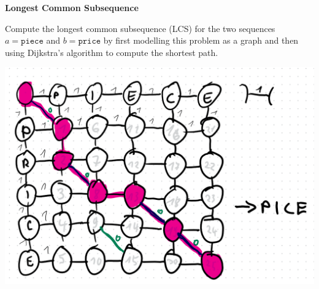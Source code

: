\question \textbf{Longest Common Subsequence}

Compute the longest common subsequence (LCS) for the two sequences $a = \texttt{piece}$ and $b = \texttt{price}$ by first modelling this problem as a graph and then using Dijkstra's algorithm to compute the shortest path.

\begin{solution}

\includegraphics[width=0.8\linewidth]{task_4/sheet09_a4.png}
\end{solution}